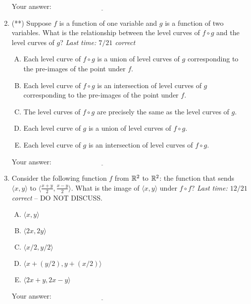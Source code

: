 \documentclass[10pt]{amsart}
\begin{document}
\begin{enumerate}
  \vspace{0.05in}
  Your answer: $\underline{\qquad\qquad\qquad\qquad\qquad\qquad\qquad}$
  \vspace{0.5in}

\item (**) Suppose $f$ is a function of one variable and $g$ is a function
  of two variables. What is the relationship between the level curves
  of $f \circ g$ and the level curves of $g$? {\em Last time: $7/21$ correct}

  \begin{enumerate}[(A)]
  \item Each level curve of $f \circ g$ is a union of level curves of
    $g$ corresponding to the pre-images of the point under $f$.
  \item Each level curve of $f \circ g$ is an intersection of level
    curves of $g$ corresponding to the pre-images of the point under $f$.
  \item The level curves of $f \circ g$ are precisely the same as the
    level curves of $g$.
  \item Each level curve of $g$ is a union of level curves of $f \circ g$.
  \item Each level curve of $g$ is an intersection of level curves of $f \circ g$.
  \end{enumerate}

  \vspace{0.05in}
  Your answer: $\underline{\qquad\qquad\qquad\qquad\qquad\qquad\qquad}$
  \vspace{0.5in}
  
\item Consider the following function $f$ from $\mathbb{R}^2$ to $\mathbb{R}^2$: the
  function that sends $\langle x,y \rangle$ to $\langle \frac{x +
  y}{2}, \frac{x - y}{2} \rangle$. What is the image of $\langle x,y
  \rangle$ under $f \circ f$? {\em Last time: $12/21$ correct} -- DO
  NOT DISCUSS.

  \begin{enumerate}[(A)]
  \item $\langle x,y \rangle$
  \item $\langle 2x,2y \rangle$
  \item $\langle x/2,y/2 \rangle$
  \item $\langle x + (y/2), y + (x/2) \rangle$
  \item $\langle 2x + y, 2x - y \rangle$
  \end{enumerate}
  
  \vspace{0.05in}
  Your answer: $\underline{\qquad\qquad\qquad\qquad\qquad\qquad\qquad}$
  \vspace{0.5in}


\end{enumerate}
\end{document}
